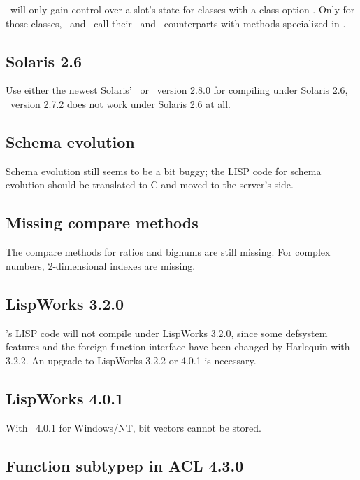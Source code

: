 \plob\ will only gain control over a slot's state for classes with a
class option . Only for
those classes, \ and \ call
their \ and \ counterparts with methods specialized in
\plobwoexcl.

\subsection{Solaris 2.6}

Use either the newest Solaris' \ or \ version 2.8.0
for compiling under Solaris 2.6, \ version 2.7.2 does not
work under Solaris 2.6 at all.

\subsection{Schema evolution}

Schema evolution still seems to be a bit buggy; the LISP code for
schema evolution should be translated to C and moved to the server's
side.

\subsection{Missing compare methods}%
\label{sec:MissingCompareMethods}

The compare methods for ratios and bignums are still missing. For
complex numbers, 2-dimensional indexes are missing.

\subsection{LispWorks 3.2.0}

\plobwoexcl's LISP code will not compile under LispWorks 3.2.0, since
some defsystem features and the foreign function interface have been
changed by Harlequin with 3.2.2. An upgrade to LispWorks 3.2.2 or
4.0.1 is necessary.

\subsection{LispWorks 4.0.1}

With \lwcl\ 4.0.1 for Windows/NT, bit vectors cannot be stored.

\subsection{Function subtypep in ACL 4.3.0}


